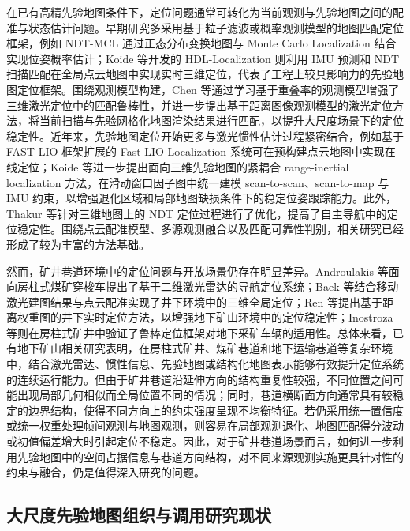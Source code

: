 在已有高精先验地图条件下，定位问题通常可转化为当前观测与先验地图之间的配准与状态估计问题。早期研究多采用基于粒子滤波或概率观测模型的地图匹配定位框架，例如 NDT-MCL 通过正态分布变换地图与 Monte Carlo Localization 结合实现位姿概率估计\cite{Kucner2015NDTMCL}；Koide 等开发的 HDL-Localization 则利用 IMU 预测和 NDT 扫描匹配在全局点云地图中实现实时三维定位，代表了工程上较具影响力的先验地图定位框架\cite{KoideHDLLocalization}。围绕观测模型构建，Chen 等通过学习基于重叠率的观测模型增强了三维激光定位中的匹配鲁棒性\cite{Chen_2020}，并进一步提出基于距离图像观测模型的激光定位方法，将当前扫描与先验网格化地图渲染结果进行匹配，以提升大尺度场景下的定位稳定性\cite{Chen2021RangeMCL}。近年来，先验地图定位开始更多与激光惯性估计过程紧密结合，例如基于 FAST-LIO 框架扩展的 Fast-LIO-Localization 系统可在预构建点云地图中实现在线定位\cite{AlamanosFastLIOLocalization}；Koide 等进一步提出面向三维先验地图的紧耦合 range-inertial localization 方法，在滑动窗口因子图中统一建模 scan-to-scan、scan-to-map 与 IMU 约束，以增强退化区域和局部地图缺损条件下的稳定位姿跟踪能力\cite{Koide2024RILocalization}。此外，Thakur 等针对三维地图上的 NDT 定位过程进行了优化，提高了自主导航中的定位稳定性\cite{Thakur_2024}。围绕点云配准模型、多源观测融合以及匹配可靠性判别，相关研究已经形成了较为丰富的方法基础。

然而，矿井巷道环境中的定位问题与开放场景仍存在明显差异。Androulakis 等面向房柱式煤矿穿梭车提出了基于二维激光雷达的导航定位系统\cite{Androulakis2021ShuttleCar}；Baek 等结合移动激光建图结果与点云配准实现了井下环境中的三维全局定位\cite{Baek2022MineLocalization}；Ren 等提出基于距离权重图的井下实时定位方法，以增强地下矿山环境中的定位稳定性\cite{Ren2022DWM}；Inostroza 等则在房柱式矿井中验证了鲁棒定位框架对地下采矿车辆的适用性\cite{Inostroza_2023}。总体来看，已有地下矿山相关研究表明，在房柱式矿井、煤矿巷道和地下运输巷道等复杂环境中，结合激光雷达、惯性信息、先验地图或结构化地图表示能够有效提升定位系统的连续运行能力\cite{Liu_2025}。但由于矿井巷道沿延伸方向的结构重复性较强，不同位置之间可能出现局部几何相似而全局位置不同的情况；同时，巷道横断面方向通常具有较稳定的边界结构，使得不同方向上的约束强度呈现不均衡特征。若仍采用统一置信度或统一权重处理帧间观测与地图观测，则容易在局部观测退化、地图匹配得分波动或初值偏差增大时引起定位不稳定。因此，对于矿井巷道场景而言，如何进一步利用先验地图中的空间占据信息与巷道方向结构，对不同来源观测实施更具针对性的约束与融合，仍是值得深入研究的问题。

\subsection{大尺度先验地图组织与调用研究现状}


